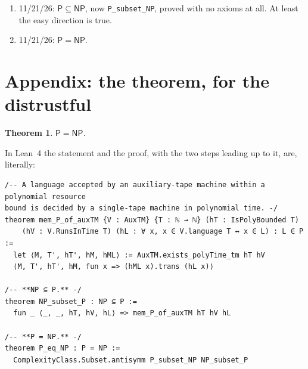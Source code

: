 \documentclass[11pt,a4paper]{amsart}
\newtheorem{teorema}{Theorem}
\theoremstyle{remark}
\begin{document}
\begin{enumerate}
        the \texttt{disagio} tactic are retired. The one axiom becomes the
        tape reduction theorem of Hartmanis and Stearns~\cite{hs}, which dates
        from 1965 and never hurt anybody.\footnote{I confess it here, in a
        footnote, where nobody reads. The 1965 theorem says that a two-tape
        machine can be simulated by a single-tape one with a quadratic
        slowdown, and that the two accept the same language. Our axiom says
        exactly that. Except that our two-tape machine found the certificate
        already written on its second tape, while the single-tape one receives
        only~$x$: to accept the same language, it has to find the certificate
        by itself, in polynomial time. Read in a hurry, it is a classic; read
        slowly, it says $\mathsf{NP} \subseteq \mathsf{P}$. It sits in the
        middle of a file of forty-odd genuine lemmas on the simulation time,
        where nobody reads slowly. Except Lean, which names it at every
        build.}
  \item 11/21/26: $\mathsf{P} \subseteq \mathsf{NP}$, now
        \texttt{P\_subset\_NP}, proved with no axioms at all. At least the
        easy direction is true.
  \item 11/21/26: $\mathsf{P} = \mathsf{NP}$.
\end{enumerate}

\appendix
\section*{Appendix: the theorem, for the distrustful}

\begin{teorema}\label{thm:main}
$\mathsf{P} = \mathsf{NP}$.
\end{teorema}

In Lean~4 the statement and the proof, with the two steps leading up to
it, are, literally:

\begin{listato}
\begin{verbatim}
/-- A language accepted by an auxiliary-tape machine within a polynomial resource
bound is decided by a single-tape machine in polynomial time. -/
theorem mem_P_of_auxTM {V : AuxTM} {T : ℕ → ℕ} (hT : IsPolyBounded T)
    (hV : V.RunsInTime T) (hL : ∀ x, x ∈ V.language T ↔ x ∈ L) : L ∈ P :=
  let ⟨M, T', hT', hM, hML⟩ := AuxTM.exists_polyTime_tm hT hV
  ⟨M, T', hT', hM, fun x => (hML x).trans (hL x)⟩

/-- **NP ⊆ P.** -/
theorem NP_subset_P : NP ⊆ P :=
  fun _ ⟨_, _, hT, hV, hL⟩ => mem_P_of_auxTM hT hV hL

/-- **P = NP.** -/
theorem P_eq_NP : P = NP :=
  ComplexityClass.Subset.antisymm P_subset_NP NP_subset_P
\end{verbatim}
\end{listato}
\end{document}
